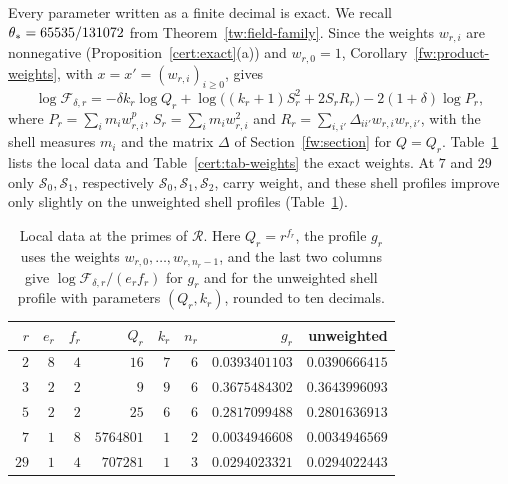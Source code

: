Every parameter written as a finite decimal is exact. We recall
$\theta_*=65535/131072$ from Theorem~\ref{tw:field-family}. Since the
weights $w_{r,i}$ are nonnegative (Proposition~\ref{cert:exact}(a)) and
$w_{r,0}=1$,
Corollary~\ref{fw:product-weights}, with $x=x'=(w_{r,i})_{i\ge0}$, gives
\begin{equation}\label{cert:finite-factor}
 \log\mathcal F_{\delta,r}
 =-\delta k_r\log Q_r+\log\bigl((k_r+1)S_r^2+2S_rR_r\bigr)
 -2(1+\delta)\log P_r,
\end{equation}
where $P_r=\sum_im_iw_{r,i}^p$, $S_r=\sum_im_iw_{r,i}^2$ and
$R_r=\sum_{i,i'}\Delta_{ii'}w_{r,i}w_{r,i'}$, with the shell measures
$m_i$ and the matrix $\Delta$ of Section~\ref{fw:section} for $Q=Q_r$.
Table~\ref{cert:tab-local} lists the local data and
Table~\ref{cert:tab-weights} the exact weights. At $7$ and $29$ only
$\mathcal S_0,\mathcal S_1$, respectively $\mathcal S_0,\mathcal
S_1,\mathcal S_2$, carry weight, and these shell profiles improve only
slightly on the unweighted shell profiles (Table~\ref{cert:tab-local}).

\begin{table}[htbp]
\centering\small
\caption{Local data at the primes of $\mathcal R$. Here $Q_r=r^{f_r}$,
the profile $g_r$ uses the weights $w_{r,0},\dots,w_{r,n_r-1}$, and the
last two columns give $\log\mathcal F_{\delta,r}/(e_rf_r)$ for $g_r$
and for the unweighted shell profile with parameters $(Q_r,k_r)$,
rounded to ten decimals.}
\label{cert:tab-local}
\begin{tabular}{rrrrrrrr}
\toprule
$r$ & $e_r$ & $f_r$ & $Q_r$ & $k_r$ & $n_r$ & $g_r$ & unweighted\\
\midrule
$2$ & $8$ & $4$ & $16$ & $7$ & $6$ & $0.0393401103$ & $0.0390666415$\\
$3$ & $2$ & $2$ & $9$ & $9$ & $6$ & $0.3675484302$ & $0.3643996093$\\
$5$ & $2$ & $2$ & $25$ & $6$ & $6$ & $0.2817099488$ & $0.2801636913$\\
$7$ & $1$ & $8$ & $5764801$ & $1$ & $2$ & $0.0034946608$ & $0.0034946569$\\
$29$ & $1$ & $4$ & $707281$ & $1$ & $3$ & $0.0294023321$ & $0.0294022443$\\
\bottomrule
\end{tabular}
\end{table}



